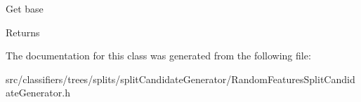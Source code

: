 Get base \begin{DoxyReturn}{Returns}

\end{DoxyReturn}


The documentation for this class was generated from the following file\-:\begin{DoxyCompactItemize}
\item 
src/classifiers/trees/splits/split\-Candidate\-Generator/Random\-Features\-Split\-Candidate\-Generator.\-h\end{DoxyCompactItemize}
